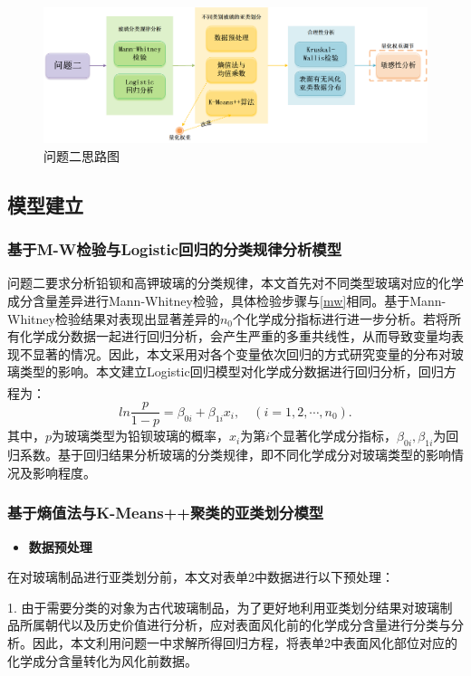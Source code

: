 \documentclass[withoutpreface,bwprint]{cumcmthesis} %
\begin{document}
\begin{figure}[H]
\centering
\includegraphics[width=1\textwidth]{figure/问题二}
\caption{问题二思路图}
\end{figure}


\subsection{模型建立}
\subsubsection{基于M-W检验与Logistic回归的分类规律分析模型}
问题二要求分析铅钡和高钾玻璃的分类规律，本文首先对不同类型玻璃对应的化学成分含量差异进行Mann-Whitney检验，具体检验步骤与\ref{mw}相同。基于Mann-Whitney检验结果对表现出显著差异的$n_0$个化学成分指标进行进一步分析。若将所有化学成分数据一起进行回归分析，会产生严重的多重共线性，从而导致变量均表现不显著的情况。因此，本文采用对各个变量依次回归的方式研究变量的分布对玻璃类型的影响。本文建立Logistic回归模型对化学成分数据进行回归分析，回归方程为\textsuperscript{\cite{ref6}}：
\begin{equation}
 ln \frac{p}{1-p} = \beta_{0i} + \beta_{1i} x_i,\quad (i = 1,2,\cdots,n_0).
\end{equation}
其中，$p$为玻璃类型为铅钡玻璃的概率，$x_i$为第$i$个显著化学成分指标，$\beta_{0i} , \beta_{1i}$为回归系数。基于回归结果分析玻璃的分类规律，即不同化学成分对玻璃类型的影响情况及影响程度。

\subsubsection{基于熵值法与K-Means++聚类的亚类划分模型}

\begin{itemize}
  \item \textbf{数据预处理}
\end{itemize}


在对玻璃制品进行亚类划分前，本文对表单2中数据进行以下预处理：

1. 由于需要分类的对象为古代玻璃制品，为了更好地利用亚类划分结果对玻璃制品所属朝代以及历史价值进行分析，应对表面风化前的化学成分含量进行分类与分析。因此，本文利用问题一中求解所得回归方程，将表单2中表面风化部位对应的化学成分含量转化为风化前数据。
\end{document}
